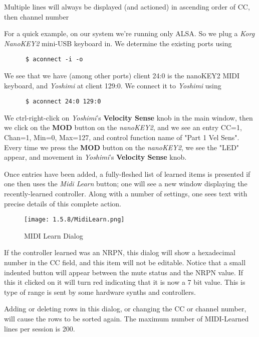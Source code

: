    Multiple lines will always be displayed (and actioned) in ascending order of
   CC, then channel number

   For a quick example, on our system we're running only ALSA.  So we
   plug a \textsl{Korg NanoKEY2} mini-USB keyboard in.
   We determine the existing ports using

   \begin{verbatim}
      $ aconnect -i -o
   \end{verbatim}

   We see that we have (among other ports) client 24:0 is the nanoKEY2 MIDI
   keyboard, and \textsl{Yoshimi} at client 129:0.
   We connect it to \textsl{Yoshimi} using

   \begin{verbatim}
      $ aconnect 24:0 129:0
   \end{verbatim}

   We ctrl-right-click on \textsl{Yoshimi}'s \textbf{Velocity Sense} knob in
   the main window, then we click on the \textbf{MOD} button on the
   \textsl{nanoKEY2}, and we see an entry CC=1, Chan=1, Min=0, Max=127, and
   control function name of "Part 1 Vel Sens".  Every time we press the
   \textbf{MOD} button on the \textsl{nanoKEY2}, we see the "LED" appear, and
   movement in \textsl{Yoshimi}'s \textbf{Velocity Sense} knob.

   Once entries have been added, a fully-fleshed list of learned items is
   presented if one then uses the \textsl{Midi Learn} button; one will
   see a new window displaying the recently-learned controller. Along with a
   number of settings, one sees text with precise details of this complete
   action.

\begin{figure}[H]
   \centering
   \texttt{[image: 1.5.8/MidiLearn.png]}
   \caption{MIDI Learn Dialog}
   \label{fig:midi_learn_dialog}
\end{figure}

   If the controller learned was an NRPN, this dialog will show a hexadecimal
   number in the CC field, and this item will not be editable. Notice that a small indented button will appear between the mute status and the NRPN value. If this it clicked on it will turn red indicating that it is now a 7 bit value. This is type of range is sent by some hardware synths and controllers.

   Adding or deleting rows in this dialog, or changing the CC or channel
   number, will cause the rows to be sorted again.
   The maximum number of MIDI-Learned lines per session is 200.

